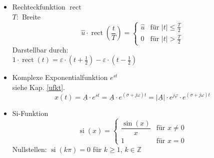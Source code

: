 \begin{mdframed}[style=exercise]
\begin{itemize}[leftmargin=*]
\[          \]
          \item{Rechteckfunktion $\operatorname{rect}$}\\
          $T:$ Breite
          \[ \hat{u} \cdot \operatorname{rect}\left(\frac{t}{T}\right) =
             \begin{cases}
                 \hat{u} & \text{f\"ur } \vert t\rvert \leq \frac{T}{2}\\
                 0 & \text{f\"ur } \vert t\rvert > \frac{T}{2}
             \end{cases}
          \]
          Darstellbar durch:\\ $1\cdot  \operatorname{rect}(t) = \varepsilon\cdot\left( t+\frac{1}{2} \right)-\varepsilon\cdot\left( t-\frac{1}{2} \right)$
          \item{Komplexe Exponentialfunktion $e^{st}$}\\
          siehe Kap. \ref{ufkt}.
          \[ x(t)=\underline{A}\cdot e^{st} = \underline{A}\cdot e^{(\sigma+j\omega)t} = |\underline{A}|\cdot e^{j\varphi} \cdot e^{(\sigma+j\omega)t}
          \]
          \item Si-Funktion
                    \[ \operatorname{si}(x) =
          \begin{cases}
          	\dfrac{\sin(x)}{x} & \text{f\"ur } x\neq 0\\
          	1 & \text{f\"ur } x = 0
          \end{cases}
          \]
          Nullstellen: $\operatorname{si}(k\pi)=0$ für $k\ge1,\, k\in \mathbb{Z}$
      \end{itemize}
  \end{mdframed}
